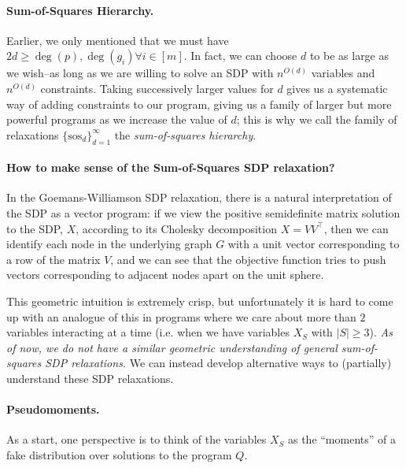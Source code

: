 \documentclass[a4paper,11pt]{article}
\newcommand{\sos}{\mathrm{sos}}
\theoremstyle{definition}
\begin{document}
\paragraph{Sum-of-Squares Hierarchy.}
Earlier, we only mentioned that we must have $2d \ge \deg(p), \deg(g_i) \forall i \in [m]$.
In fact, we can choose $d$ to be as large as we wish--as long as we are willing to solve an SDP with $n^{O(d)}$ variables and $n^{O(d)}$ constraints.
Taking successively larger values for $d$ gives us a systematic way of adding constraints to our program, giving us a family of larger but more powerful programs as we increase the value of $d$; this is why we call the family of relaxations $\{\sos_d\}_{d = 1}^{\infty}$ the {\em sum-of-squares hierarchy}.


\paragraph{How to make sense of the Sum-of-Squares SDP relaxation?}
In the Goemans-Williamson SDP relaxation, there is a natural interpretation of the SDP as a vector program: if we view the positive semidefinite matrix solution to the SDP, $X$, according to its Cholesky decomposition $X = VV^{\top}$, then we can identify each node in the underlying graph $G$ with a unit vector corresponding to a row of the matrix $V$, and we can see that the objective function tries to push vectors corresponding to adjacent nodes apart on the unit sphere.

This geometric intuition is extremely crisp, but unfortunately it is hard to come up with an analogue of this in programs where we care about more than $2$ variables interacting at a time (i.e. when we have variables $X_S$ with $|S| \ge 3$).
{\em As of now, we do not have a similar geometric understanding of general sum-of-squares SDP relaxations.}
We can instead develop alternative ways to (partially) understand these SDP relaxations.


\paragraph{Pseudomoments.}
As a start, one perspective is to think of the variables $X_S$ as the ``moments'' of a fake distribution over solutions to the program $Q$.
\end{document}
